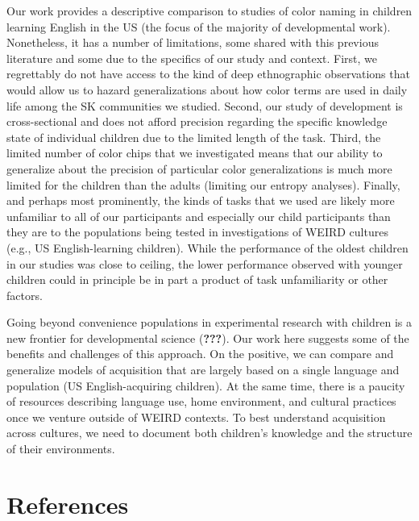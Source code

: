 \documentclass[
  english,
  ,man,floatsintext]{apa6}
\begin{document}
Our work provides a descriptive comparison to studies of color naming in children learning English in the US (the focus of the majority of developmental work). Nonetheless, it has a number of limitations, some shared with this previous literature and some due to the specifics of our study and context. First, we regrettably do not have access to the kind of deep ethnographic observations that would allow us to hazard generalizations about how color terms are used in daily life among the SK communities we studied. Second, our study of development is cross-sectional and does not afford precision regarding the specific knowledge state of individual children due to the limited length of the task. Third, the limited number of color chips that we investigated means that our ability to generalize about the precision of particular color generalizations is much more limited for the children than the adults (limiting our entropy analyses). Finally, and perhaps most prominently, the kinds of tasks that we used are likely more unfamiliar to all of our participants and especially our child participants than they are to the populations being tested in investigations of WEIRD cultures (e.g., US English-learning children). While the performance of the oldest children in our studies was close to ceiling, the lower performance observed with younger children could in principle be in part a product of task unfamiliarity or other factors.

Going beyond convenience populations in experimental research with children is a new frontier for developmental science ({\textbf{???}}). Our work here suggests some of the benefits and challenges of this approach. On the positive, we can compare and generalize models of acquisition that are largely based on a single language and population (US English-acquiring children). At the same time, there is a paucity of resources describing language use, home environment, and cultural practices once we venture outside of WEIRD contexts. To best understand acquisition across cultures, we need to document both children's knowledge and the structure of their environments.

\newpage

\hypertarget{references}{%
\section{References}\label{references}}

\begingroup
\setlength{\parindent}{-0.5in}
\setlength{\leftskip}{0.5in}
\end{document}
